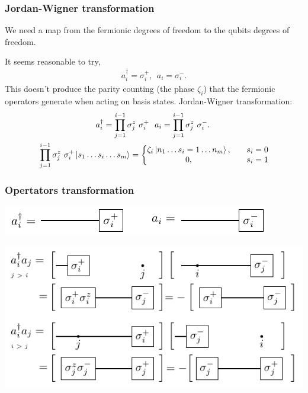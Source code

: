 \documentclass{beamer}
\renewcommand{\(}{\left(}
\renewcommand{\)}{\right)}
\renewcommand{\[}{\left[}
\renewcommand{\]}{\right]}
\begin{document}
\begin{frame}
    \frametitle{Jordan-Wigner transformation}
    \begin{framed}
        We need a map from the fermionic degrees of freedom to the qubits degrees of freedom.
    \end{framed}
    It seems reasonable to try, 
    \begin{align*}
        a^\dagger_i = \sigma_i^{+} , \ \  a_i = \sigma_i^{-}. 
    \end{align*}
    This doesn't produce the parity counting (the phase $\zeta_i$) that the fermionic operators generate when acting on basis states. 
    \pause
    Jordan-Wigner transformation: 
    \begin{align*}
        &\qquad \qquad \qquad \quad a^\dagger_i = \prod_{j = 1}^{i-1} \sigma^{z}_j \  \sigma_i^{+} \ \  a_i =  \prod_{j = 1}^{i-1} \sigma^{z}_j \  \sigma_i^{-}. \\
        &\prod_{j = 1}^{i-1} \sigma^{z}_j \  \sigma^{+}_i \ket{s_1 \dots s_i \dots s_m} = \left\{ \begin{matrix}
            \zeta_i \ket{n_1 \dots s_i = 1 \dots n_m}, && s_i = 0 \\ 
            0, && s_i = 1
        \end{matrix} \right.
    \end{align*}

\end{frame}

\begin{frame}
    \frametitle{Opertators transformation}
    \begin{center}
        \includegraphics[]{jordan_wigner.pdf}
    \end{center}
    \pause
    \vspace{20pt}
    \begin{center}
        \includegraphics[scale = 1]{operator_jordan_wigner.pdf}
    \end{center}

\end{frame}
\end{document}
